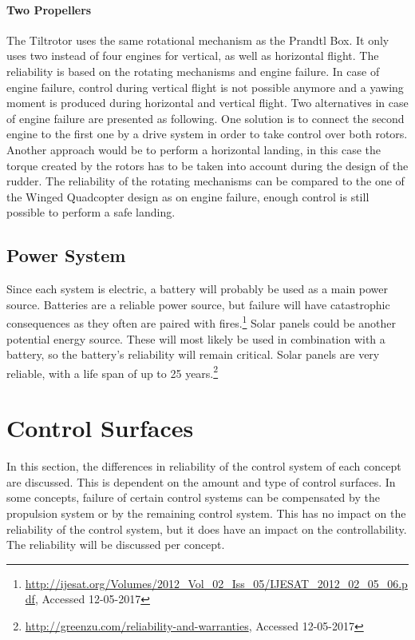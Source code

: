 \paragraph{Two Propellers}
The Tiltrotor uses the same rotational mechanism as the Prandtl Box. It only uses two instead of four engines for vertical, as well as horizontal flight. The reliability is based on the rotating mechanisms and engine failure. In case of engine failure, control during vertical flight is not possible anymore and a yawing moment is produced during horizontal and vertical flight. Two alternatives in case of engine failure are presented as following. One solution is to connect the second engine to the first one by a drive system in order to take control over both rotors. Another approach would be to perform a horizontal landing, in this case the torque created by the rotors has to be taken into account during the design of the rudder. The reliability of the rotating mechanisms can be compared to the one of the Winged Quadcopter design as on engine failure, enough control is still possible to perform a safe landing. 



\subsection{Power System}
Since each system is electric, a battery will probably be used as a main power source. Batteries are a reliable power source, but failure will have catastrophic consequences as they often are paired with fires.\footnote{\url{http://ijesat.org/Volumes/2012_Vol_02_Iss_05/IJESAT_2012_02_05_06.pdf}, Accessed 12-05-2017} Solar panels could be another potential energy source. These will most likely be used in combination with a battery, so the battery's reliability will remain critical. Solar panels are very reliable, with a life span of up to 25 years.\footnote{\url{http://greenzu.com/reliability-and-warranties}, Accessed 12-05-2017} 




\section{Control Surfaces}

In this section, the differences in reliability of the control system of each concept are discussed. This is dependent on the amount and type of control surfaces. In some concepts, failure of certain control systems can be compensated by the propulsion system or by the remaining control system. This has no impact on the reliability of the control system, but it does have an impact on the controllability. The reliability will be discussed per concept.


